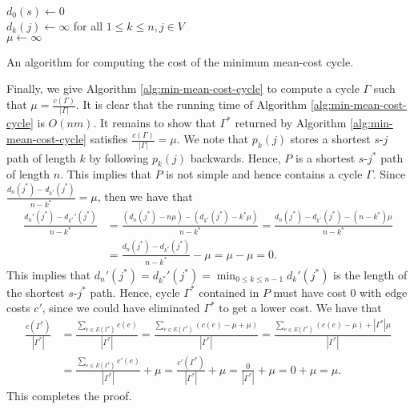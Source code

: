 \documentclass[letterpaper,reqno,12pt]{article}
\begin{document}
\begin{algorithm}
  $d_0(s) \leftarrow 0$ \\
  $d_k(j) \leftarrow \infty$ for all $1 \leq k \leq n, j \in V$ \\
  $\mu \leftarrow \infty$ \\
  \caption{An algorithm for computing the cost of the minimum mean-cost cycle.}
  \label{alg:min-mean-cost-cycle-value}
\end{algorithm}

Finally, we give Algorithm \ref{alg:min-mean-cost-cycle} to compute a cycle $\Gamma$ such that $\mu = \frac{c(\Gamma)}{|\Gamma|}$. It is clear that the running time of Algorithm \ref{alg:min-mean-cost-cycle} is $O(nm)$. It remains to show that $\Gamma^*$ returned by Algorithm \ref{alg:min-mean-cost-cycle} satisfies $\frac{c(\Gamma)}{|\Gamma|} = \mu$. We note that $p_k(j)$ stores a shortest $s$-$j$ path of length $k$ by following $p_k(j)$ backwards. Hence, $P$ is a shortest $s$-$j^*$ path of length $n$. This implies that $P$ is not simple and hence contains a cycle $\Gamma$. Since $\frac{d_n(j^*) - d_{k^*}(j^*)}{n - k^*} = \mu$, then we have that
\begin{align*}
  \frac{d_n'\left(j^*\right) - d_{k^*}'\left(j^*\right)}{n - k^*} &= \frac{\left(d_n\left(j^*\right) - n\mu\right)- \left(d_{k^*}\left(j^*\right) - k^* \mu\right)}{n - k^*} = \frac{d_n\left(j^*\right) - d_{k^*}\left(j^*\right) - \left(n - k^*\right) \mu}{n - k^*} \\
  &= \frac{d_n\left(j^*\right) - d_{k^*}\left(j^*\right)}{n - k^*} - \mu = \mu - \mu = 0.
\end{align*}
This implies that $d_n'(j^*) = d_{k^*}'(j^*) = \min_{0 \leq k \leq n - 1} d_k'(j^*)$ is the length of the shortest $s$-$j^*$ path. Hence, cycle $\Gamma^*$ contained in $P$ must have cost $0$ with edge costs $c'$, since we could have eliminated $\Gamma^*$ to get a lower cost. We have that
\begin{align*}
  \frac{c\left(\Gamma^*\right)}{\left|\Gamma^*\right|} &= \frac{\sum_{e \in E\left(\Gamma^*\right)} c(e)}{\left|\Gamma^*\right|} = \frac{\sum_{e \in E\left(\Gamma^*\right)} (c(e) - \mu + \mu)}{\left|\Gamma^*\right|} = \frac{\sum_{e \in E\left(\Gamma^*\right)} (c(e) - \mu) + \left|\Gamma^*\right| \mu}{\left|\Gamma^*\right|} \\
  &= \frac{\sum_{e \in E\left(\Gamma^*\right)} c'(e)}{\left|\Gamma^*\right|} + \mu = \frac{c'\left(\Gamma^*\right)}{\left|\Gamma^*\right|} + \mu = \frac{0}{\left|\Gamma^*\right|} + \mu = 0 + \mu = \mu.
\end{align*}
This completes the proof.
\end{document}
